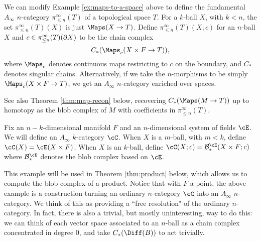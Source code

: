 



\begin{example}
\rm
\label{ex:chains-of-maps-to-a-space}
We can modify Example \ref{ex:maps-to-a-space} above to define the fundamental $A_\infty$ $n$-category $\pi^\infty_{\le n}(T)$ of a topological space $T$.
For a $k$-ball $X$, with $k < n$, the set $\pi^\infty_{\leq n}(T)(X)$ is just $\Maps(X \to T)$.
Define $\pi^\infty_{\leq n}(T)(X; c)$ for an $n$-ball $X$ and $c \in \pi^\infty_{\leq n}(T)(\partial X)$ to be the chain complex
\[
	C_*(\Maps_c(X\times F \to T)),
\]
where $\Maps_c$ denotes continuous maps restricting to $c$ on the boundary,
and $C_*$ denotes singular chains.
Alternatively, if we take the $n$-morphisms to be simply $\Maps_c(X\times F \to T)$, 
we get an $A_\infty$ $n$-category enriched over spaces.
\end{example}

See also Theorem \ref{thm:map-recon} below, recovering $C_*(\Maps(M \to T))$ up to 
homotopy as the blob complex of $M$ with coefficients in $\pi^\infty_{\le n}(T)$.

\begin{example}
\rm
\label{ex:blob-complexes-of-balls}
Fix an $n{-}k$-dimensional manifold $F$ and an $n$-dimensional system of fields $\cE$.
We will define an $A_\infty$ $k$-category $\cC$.
When $X$ is a $m$-ball, with $m<k$, define $\cC(X) = \cE(X\times F)$.
When $X$ is an $k$-ball,
define $\cC(X; c) = \bc^\cE_*(X\times F; c)$
where $\bc^\cE_*$ denotes the blob complex based on $\cE$.
\end{example}

This example will be used in Theorem \ref{thm:product} below, which allows us to compute the blob complex of a product.
Notice that with $F$ a point, the above example is a construction turning an ordinary 
$n$-category $\cC$ into an $A_\infty$ $n$-category.
We think of this as providing a ``free resolution" 
of the ordinary $n$-category. 
In fact, there is also a trivial, but mostly uninteresting, way to do this: 
we can think of each vector space associated to an $n$-ball as a chain complex concentrated in degree $0$, 
and take $\CD{B}$ to act trivially. 

